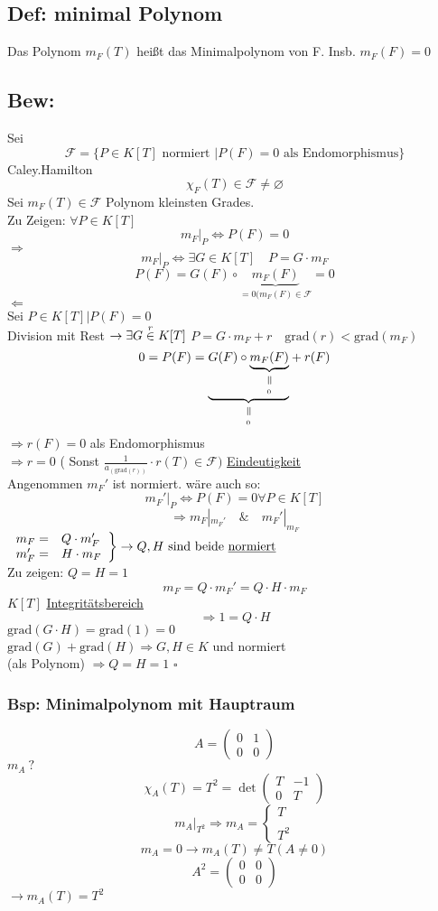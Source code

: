 \documentclass[titlepage,12pt,a4paper,ngerman]{report}
\newenvironment{bew}[1]{\subsection{Bew: #1}}{\hfill$\square$}
\newcommand{\Bew}[2]{\begin{bew}{#1}#2\end{bew}}
\newcommand{\verteq}{\rotatebox{90}{$\,=$}}
\newcommand{\equalto}[2]{\underset{\scriptstyle\overset{\mkern4mu\verteq}{#2}}{#1}}
\newcommand{\tx}[1]{\textrm{#1}}
\newcommand{\ub}[1]{\underbrace{#1}}
\newcommand{\grad}{\tx{grad}}
\begin{document}
\subsection{Def: minimal Polynom}
Das Polynom $m_F(T)$ heißt das Minimalpolynom von F. Insb. $m_F(F) = 0$
\Bew{} {Sei $$\mathcal{F} = \{ P\in K[T] \tx{ normiert } |P(F) = 0 \tx{ als Endomorphismus}\}$$
Caley.Hamilton
$$\chi_F(T) \in \mathcal{F} \neq \varnothing$$
Sei $m_F(T) \in \mathcal{F}$ Polynom kleinsten Grades.\\
Zu Zeigen: $\forall P\in K[T]$
$$m_F|_P \Leftrightarrow P(F) = 0$$
$\Rightarrow$\\
$$m_F|_P \Leftrightarrow \exists G \in K[T] \quad P = G \cdot m_F$$
$$ P(F) = G(F) \circ \ub{m_F(F)}_{= 0 (m_F(F) \in \mathcal{F}} = 0$$
$\Leftarrow$\\
Sei $P \in K[T] | P(F) = 0$\\
Division mit Rest $\rightarrow \exists G \buildrel r \over \in K[T]$
$ P = G \cdot m_F + r \quad \grad(r) < \grad(m_F)$
$$0=P(F) = \equalto{\ub{G(F) \circ \equalto{\ub{m_F(F)}}{_{0}}}}{_{ 0}} + r(F)$$
$\Rightarrow r(F) = 0$ als Endomorphismus\\
$ \Rightarrow r = 0$ ( Sonst $\frac{1}{a_{(\grad(r))}} \cdot r(T) \in \mathcal{F})$
\underline{Eindeutigkeit}\\
Angenommen $m_F'$ ist normiert. wäre auch so:
$$m_F'|_P \Leftrightarrow P(F) = 0 \forall P \in K[T]$$
$$\Rightarrow m_F|_{m_F'} \quad \& \quad m_F'|_{m_F}$$ 
$\left. \begin{array}{ll}
m_F = & Q \cdot m_F' \\
m_F' = & H \cdot m_F
\end{array} \right\} \rightarrow Q,H \tx{ sind beide \underline{normiert}} $\\[10pt]
Zu zeigen: \underline{$Q=H=1$}
$$m_F = Q \cdot m_F' = Q \cdot H \cdot m_F$$
$K[T]$ \underline{Integritätsbereich}
$$ \Rightarrow 1 = Q \cdot H$$
$\grad(G\cdot H) = \grad (1) = 0$\\
$\grad(G) + \grad(H) \Rightarrow G,H \in K $ und normiert\\
(als Polynom) $\Rightarrow Q = H = 1$
}

\subsubsection{Bsp: Minimalpolynom mit Hauptraum}
$$A = \begin{pmatrix}
0 & 1 \\
0 & 0
\end{pmatrix}$$
$m_A \ ? $
$$\chi_A(T) = T^2 = \det\begin{pmatrix}
T & -1 \\
0 & T
\end{pmatrix}$$
$$m_A|_{T^2} \Rightarrow m_A = \left\{ \begin{array}{ll}
T \\ \\ T^2
\end{array} \right.$$
$$m_A = 0 \rightarrow m_A(T) \neq T (A\neq 0)$$
$$A^2 = \begin{pmatrix}
0 & 0\\
0 & 0
\end{pmatrix}$$
$\rightarrow m_A(T) = T^2$
\end{document}
